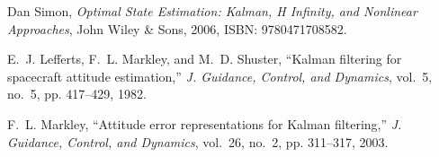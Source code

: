 \documentclass[11pt,letterpaper]{article}
\begin{document}
\begin{thebibliography}{20}
Dan Simon,
\textit{Optimal State Estimation: Kalman, H Infinity, and Nonlinear Approaches},
John Wiley \& Sons, 2006,
ISBN: 9780471708582.

E.~J. Lefferts, F.~L. Markley, and M.~D. Shuster, “Kalman filtering for spacecraft attitude estimation,” \emph{J. Guidance, Control, and Dynamics}, vol.~5, no.~5, pp. 417–429, 1982.

F.~L. Markley, “Attitude error representations for Kalman filtering,” \emph{J. Guidance, Control, and Dynamics}, vol.~26, no.~2, pp. 311–317, 2003.

\end{thebibliography}
\end{document}
